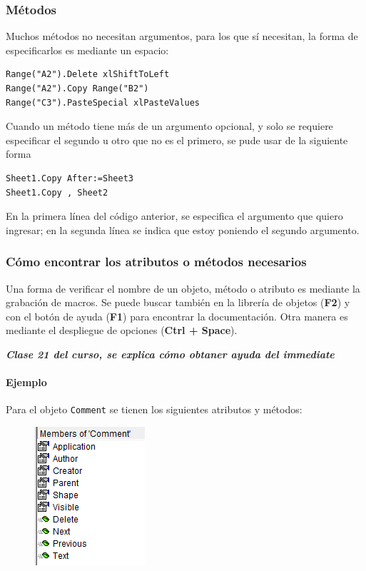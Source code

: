 \subsubsection{Métodos}

Muchos métodos no necesitan argumentos, para los que sí necesitan, la forma de especificarlos es mediante un espacio:

\begin{verbatim}
Range("A2").Delete xlShiftToLeft
Range("A2").Copy Range("B2")
Range("C3").PasteSpecial xlPasteValues
\end{verbatim}

Cuando un método tiene más de un argumento opcional, y solo se requiere especificar el segundo u otro que no es el primero, se pude usar de la siguiente forma

\begin{verbatim}
Sheet1.Copy After:=Sheet3
Sheet1.Copy , Sheet2
\end{verbatim}

En la primera línea del código anterior, se especifica el argumento que quiero ingresar; en la segunda línea se indica que estoy poniendo el segundo argumento.

\subsubsection{Cómo encontrar los atributos o métodos necesarios}

Una forma de verificar el nombre de un objeto, método o atributo es mediante la grabación de macros. Se puede buscar también en la librería de objetos (\textbf{F2}) y con el botón de ayuda (\textbf{F1}) para encontrar la documentación. Otra manera es mediante el despliegue de opciones (\textbf{Ctrl + Space}).

\textit{\textbf{Clase 21 del curso, se explica cómo obtaner ayuda del immediate}}

 \paragraph{Ejemplo} Para el objeto \texttt{Comment} se tienen los siguientes atributos y métodos:
 
 \begin{figure}[H]
     \centering
     \includegraphics{ExcelMacro/commentobj.png}
 \end{figure}
 
